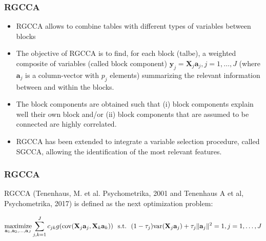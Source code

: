 \documentclass[10pt,xcolor=dvipsnames]{beamer}\usepackage[]{graphicx}\usepackage[]{color}
\newcommand{\X}{\mathbf{X}}
\newcommand{\ma}[1]{\ensuremath{\mathbf{#1}}}
\newcommand{\y}{\mathbf{y}}
\begin{document}
\begin{frame}[plain]\frametitle{RGCCA}

\begin{itemize}
 \item RGCCA allows to combine tables with different types of variables between blocks
 \item The objective of RGCCA is to find, for each block (talbe), a weighted composite of variables (called block component) $\y_j= \X_j \ma a_j,j=1, \ldots,J$ (where $\ma a_j$ is a column-vector with  $p_j$ elements) summarizing the relevant information between and within the blocks. 
 \item The block components are obtained such that (i) block components explain well their own block and/or (ii) block components that are assumed to be connected are highly correlated. 
 \item RGCCA has been extended to integrate a variable selection procedure, called SGCCA, allowing the identification of the most relevant features.
\end{itemize}

\end{frame}


\begin{frame}[plain]\frametitle{RGCCA}

RGCCA (Tenenhaus, M. et al. Psychometrika, 2001 and Tenenhaus A et al, Psychometrika, 2017) is defined as the next optimization problem:

\begin{equation*}
\displaystyle \underset{\ma a_1,\ma a_2, \ldots,\ma a_J}{\text{maximize}} \sum_{j, k = 1}^J c_{jk}g(\mathrm{cov}(\X_j\ma a_j, \X_k\ma a_k)) \\ \mathrm{~~s.t.~~} (1-\tau_j)\mathrm{var}(\X_j\ma a_j) + \tau_j\Vert \ma a_j \Vert^2 = 1, j=1, \ldots,J
\end{equation*}

\end{frame}
\end{document}
